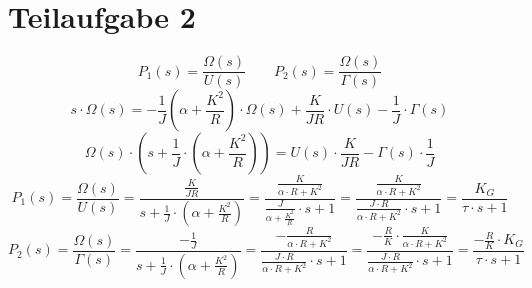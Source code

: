 \section{Teilaufgabe 2}
\[ P_1(s) = \frac{\Omega(s)}{U(s)} \qquad P_2(s) = \frac{\Omega(s)}{\Gamma(s)} \]
\[ s \cdot \Omega(s) 
    = -\frac{1}{J} \left(\alpha + \frac{K^2}{R}\right) \cdot \Omega(s)
    + \frac{K}{JR} \cdot U(s) 
    - \frac{1}{J} \cdot \Gamma(s)
\]
\[ \Omega(s) \cdot \left(s + \frac{1}{J} \cdot \left(\alpha + \frac{K^2}{R}\right)\right) 
    = U(s) \cdot \frac{K}{JR} 
    - \Gamma(s) \cdot \frac{1}{J}
\]
\[ P_1(s) = \frac{\Omega(s)}{U(s)} 
    = \frac{\frac{K}{JR}}{s + \frac{1}{J} \cdot \left(\alpha + \frac{K^2}{R}\right)}
    = \frac{\frac{K}{\alpha \cdot R + K^2}}{\frac{J}{\alpha + \frac{K^2}{R}} \cdot s + 1}
    = \frac{\frac{K}{\alpha \cdot R + K^2}}{\frac{J \cdot R}{\alpha \cdot R + K^2} \cdot s + 1}
    = \frac{K_G}{\tau \cdot s + 1}
\]
\[ P_2(s) = \frac{\Omega(s)}{\Gamma(s)}
    = \frac{-\frac{1}{J}}{s + \frac{1}{J} \cdot \left(\alpha + \frac{K^2}{R}\right)}
    = \frac{-\frac{R}{\alpha \cdot R + K^2}}{\frac{J \cdot R}{\alpha \cdot R + K^2} \cdot s + 1}
    = \frac{-\frac{R}{K} \cdot \frac{K}{\alpha \cdot R + K^2}}{\frac{J \cdot R}{\alpha \cdot R + K^2} \cdot s + 1}
    = \frac{-\frac{R}{K} \cdot K_G}{\tau \cdot s + 1}
\]
